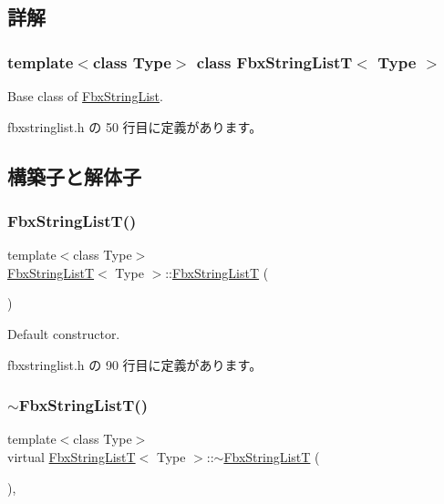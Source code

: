 \subsection{詳解}
\subsubsection*{template$<$class Type$>$\newline
class Fbx\+String\+List\+T$<$ Type $>$}

Base class of \hyperlink{class_fbx_string_list}{Fbx\+String\+List}. 

 fbxstringlist.\+h の 50 行目に定義があります。



\subsection{構築子と解体子}
\mbox{\label{class_fbx_string_list_t_a23b6c1e63569190855827463157c6e89}} 
\subsubsection{\texorpdfstring{Fbx\+String\+List\+T()}{FbxStringListT()}}
{\footnotesize\ttfamily template$<$class Type$>$ \\
\hyperlink{class_fbx_string_list_t}{Fbx\+String\+ListT}$<$ Type $>$\+::\hyperlink{class_fbx_string_list_t}{Fbx\+String\+ListT} (\begin{DoxyParamCaption}{ }\end{DoxyParamCaption})\hspace{0.3cm}{\ttfamily [inline]}}



Default constructor. 



 fbxstringlist.\+h の 90 行目に定義があります。

\mbox{\label{class_fbx_string_list_t_a15d3f55726d1d30f0f87d7ade9bcc2ab}} 
\subsubsection{\texorpdfstring{$\sim$\+Fbx\+String\+List\+T()}{~FbxStringListT()}}
{\footnotesize\ttfamily template$<$class Type$>$ \\
virtual \hyperlink{class_fbx_string_list_t}{Fbx\+String\+ListT}$<$ Type $>$\+::$\sim$\hyperlink{class_fbx_string_list_t}{Fbx\+String\+ListT} (\begin{DoxyParamCaption}{ }\end{DoxyParamCaption})\hspace{0.3cm}{\ttfamily [inline]}, {\ttfamily [virtual]}}



